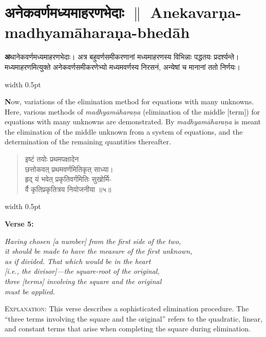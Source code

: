 \documentclass[11pt,a4paper]{article}
\newcommand{\dev}[1]{{\devanagarifont #1}}
\newcommand{\vs}{\vspace{0.5em}}
\newenvironment{sanskritverse}{%
  \begin{quote}\devanagarifont\textcolor{versecolor}%
}{%
  \end{quote}
}
\newcommand{\bilingual}[2]{%
  \par\vspace{0.5em}%
  \noindent\begin{minipage}[t]{0.47\textwidth}%
  \setlength{\parindent}{0pt}%
  \small #1%
  \end{minipage}%
  \hfill\textcolor{columnrule}{\vrule width 0.5pt}\hfill%
  \begin{minipage}[t]{0.47\textwidth}%
  \setlength{\parindent}{0pt}%
  \small\raggedright #2%
  \end{minipage}%
  \par\vspace{0.5em}%
}
\begin{document}
{\newpage

\section*{\dev{अनेकवर्णमध्यमाहरणभेदाः} $\parallel$ Anekavar\d{n}a-madhyam\={a}hara\d{n}a-bhed\={a}h}

\bilingual{\textbf{\dev{अ}}थानेकवर्णमध्यमाहरणभेदाः। अत्र बहुवर्णसमीकरणानां मध्यमाहरणस्य विभिन्नाः पद्धतयः प्रदर्श्यन्ते। मध्यमाहरणमित्युक्ते अनेकवर्णसमीकरणेभ्यो मध्यमवर्णस्य निरसनं, अन्येषां च मानानां ततो निर्णयः।
}{%
\textbf{N}ow, variations of the elimination method for equations with many unknowns. Here, various methods of \textit{madhyam\={a}hara\d{n}a} (elimination of the middle [term]) for equations with many unknowns are demonstrated. By \textit{madhyam\={a}hara\d{n}a} is meant the elimination of the middle unknown from a system of equations, and the determination of the remaining quantities thereafter.}

\vs

\bilingual{\begin{sanskritverse}
इष्टं तयोः प्रथमपक्षादेन\\
छत्तोकवत् प्रथमवर्णमितिकृत् साध्या।\\
हृद् यं भवेत् प्रकृतिवर्गमितिः सुखोर्मि-\\
र्वै कृतिप्रकृतित्रय नियोजनीया ॥५॥
\end{sanskritverse}
}{%
\textbf{Verse 5:}
\begin{flushright}
\textit{Having chosen [a number] from the first side of the two,}\\
\textit{it should be made to have the measure of the first unknown,}\\
\textit{as if divided. That which would be in the heart}\\
\textit{[i.e., the divisor]---the square-root of the original,}\\
\textit{three [terms] involving the square and the original}\\
\textit{must be applied.}
\end{flushright}
\textsc{Explanation:} This verse describes a sophisticated elimination procedure. The ``three terms involving the square and the original'' refers to the quadratic, linear, and constant terms that arise when completing the square during elimination.}

}
\end{document}
